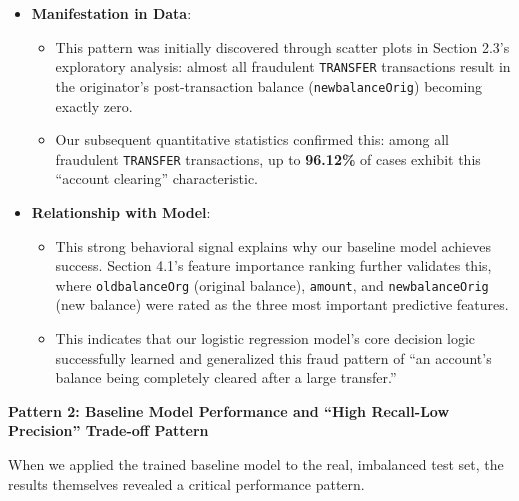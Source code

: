 \documentclass[sigplan,screen]{acmart}
\begin{document}
\begin{itemize}
\item \textbf{Manifestation in Data}:
\begin{itemize}
    \item This pattern was initially discovered through scatter plots in Section 2.3's exploratory analysis: almost all fraudulent \texttt{TRANSFER} transactions result in the originator's post-transaction balance (\texttt{newbalanceOrig}) becoming exactly zero.
    \item Our subsequent quantitative statistics confirmed this: among all fraudulent \texttt{TRANSFER} transactions, up to \textbf{96.12\%} of cases exhibit this ``account clearing'' characteristic.
\end{itemize}
\item \textbf{Relationship with Model}:
\begin{itemize}
    \item This strong behavioral signal explains why our baseline model achieves success. Section 4.1's feature importance ranking further validates this, where \texttt{oldbalanceOrg} (original balance), \texttt{amount}, and \texttt{newbalanceOrig} (new balance) were rated as the three most important predictive features.
    \item This indicates that our logistic regression model's core decision logic successfully learned and generalized this fraud pattern of ``an account's balance being completely cleared after a large transfer.''
\end{itemize}
\end{itemize}

\textbf{Pattern 2: Baseline Model Performance and ``High Recall-Low Precision'' Trade-off Pattern}

When we applied the trained baseline model to the real, imbalanced test set, the results themselves revealed a critical performance pattern.
\end{document}
